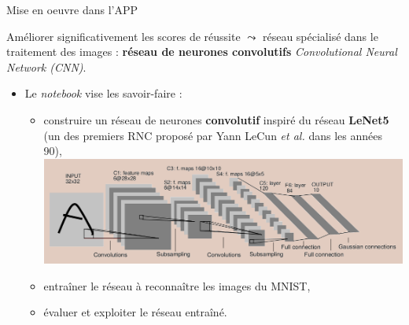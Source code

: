 \documentclass[10pt,serif,mathserif,compress,hyperref={colorlinks}]{beamer}
\begin{document}
\begin{frame}{Mise en oeuvre dans l'APP}

  {\small Améliorer significativement les scores de réussite $\leadsto$ réseau spécialisé dans le traitement des images :
    \textbf{réseau de neurones convolutifs} {\em Convolutional Neural Network (CNN)}.}
  \smallskip

  \begin{tcolorbox}[title=2 -- Auto-formation / Réseau convolutif]
    \begin{itemize}
    \item Le {\em notebook}  vise les savoir-faire :
      \begin{itemize}
      \item construire un réseau de neurones {\bf convolutif} inspiré du réseau \textbf{LeNet5} (un des premiers RNC proposé par Yann LeCun {\em et al.} dans les années 90),\\
      \hspace*{-3mm}\includegraphics[width=.7\textwidth]{images/LeNet5-2.png}\\[-2mm]
      \item entraîner le réseau à reconnaître les images du MNIST,
      \item évaluer et exploiter le réseau entraîné.
      \end{itemize}      
    \end{itemize}
  \end{tcolorbox}

\end{frame}
\end{document}
